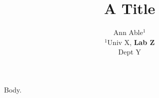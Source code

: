 \documentclass{article}
\begin{document}
\title{A Title}
\author{\begin{tabular}{c}Ann Able$^1$\\ $^1$Univ X, \bf Lab Z\\ Dept Y\end{tabular}}
\maketitle
Body.
\end{document}
